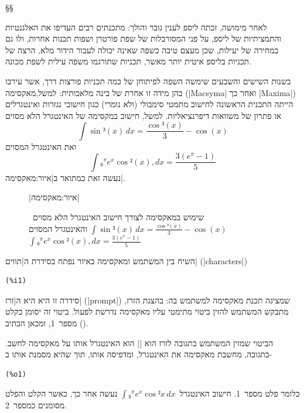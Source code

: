 §§ 

לאחר מימושה, זכתה ליספ לענין גובר והולך: מתכנתים רבים העדיפו את האלגנטיות
והתמציתיות של ליספ, על פני המסורבלות של שפת פורטרן ושפות תכנות אחרות, ולו גם
במחירה של יעילות, שכן מעצם טיבה כשפה שאינה יכולה לעבור הידור מלא, הרצה של
תכניות בליספ איטית יותר מאשר, תכניות שתורגמו משפה עילית לשפת מכונה.


בשנות השישים והשבעים שימשה השפה לפיתוחן של כמה תכניות פורצות דרך, אשר עירבו בהן
מידה זו אחרת של בינה מלאכותית: למשל,מאקסימה (\E|Macsyma| ואחר כך \E|Maxima|)
הייתה התכנית הראשונה לחישוב מתמטי סימבולי (ולא נומרי) כגון חישובי נגזרות
ואינטגרלים או פתרון של משוואות דיפרנציאליות. למשל, חישוב במקסימה של האינטגרל
הלא מסוים
\begin{equation}
  \label{eq:indefinite}
  ∫\sin³(x)\, dx=\frac{\cos³(x)}3- \cos(x)
\end{equation}
ואת האינטגרל המסוים
\begin{equation}
  \label{eq:definite}
  ∫₀^π e^x\cos²(x),dx=\frac{3 (e^π-1)}{5}
\end{equation} נעשה זאת כמתואר ב|איור:מאקסימה|.

\begin{figure}[H]
\begin{LTR}
  
\end{LTR}
\caption[שימוש במאקסימה לחישוב אינטגרלים]{שימוש במאקסימה לצורך חישוב האינטגרל הלא
מסוים~$∫\sin³(x)\,dx=\frac{\cos³(x)}3-\cos(x)$ והאינטגרל
המסוים~$∫₀^π e^x\cos²(x),dx=\frac{3(e^π-1)}{5}$}
|איור:מאקסימה|
\end{figure}
השיח בין המשתמש ומאקסימה באיור נפתח בסידרת ה\ע|תווים| (\E|characters|)
\begin{LTR}
\begin{lstlisting}[style=interaction,backgroundcolor=\color{white}]
(%i1)
\end{lstlisting}
\end{LTR}

סידרה זו היא היא ה\ע|זרז| (\E|prompt|) שמציגה תכנת מאקסימה למשתמש בה: בהצגת
הזרז, מתבקש המשתמש להזין ביטוי מתימטי עליו מאקסימה נדרשת לפעול. ביטוי זה יסומן
כקלט מספר~1, ומכאן הכתיב ().

הביטוי שמזין המשתמש בתגובה לזרז הוא \E|| הוא
האינטגרל אותו על מאקסימה לחשב. בתגובה, מחשבת מאקסימה את האינטגרל, ומדפיסה אותו,
תוך שהיא מסמנת אותו ב-
\begin{LTR}
\begin{lstlisting}[style=interaction,backgroundcolor=\color{white}]
(%o1)
\end{lstlisting}
\end{LTR}
 כלומר פלט מספר~1. חישוב האינטגרל~$∫₀^πe^x\cos²x\,dx$ נעשה אחר כך, כאשר הקלט
 והפלט מסומנים כמספר~2.

